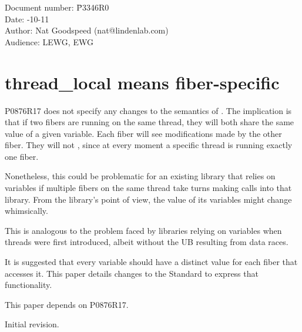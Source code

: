\documentclass[fontsize=10pt,paper=A4,pagesize,DIV=15]{scrartcl}
\begin{document}
\small
\begin{tabbing}
    Document number: \= P3346R0\\
    Date:            -10-11\\
    Author:          \> Nat Goodspeed (nat@lindenlab.com)\\
    Audience:        \> LEWG, EWG\\
\end{tabbing}

\section*{thread\_local means fiber-specific}


\tableofcontents


\label{abstract}

P0876R17\cite{P0876R17} does not specify any changes to the semantics of
. The implication is that
if two fibers are running on the same thread, they will both share the same
value of a given \tlocal variable. Each fiber will see modifications made by
the other fiber. They will not , since at every
moment a specific thread is running exactly one fiber.

Nonetheless, this could be problematic for an existing library that relies on
\tlocal variables if multiple fibers on the same thread take turns making
calls into that library. From the library's point of view, the value of its
\tlocal variables might change whimsically.

This is analogous to the problem faced by libraries relying on 
variables when threads were first introduced, albeit without the UB resulting
from data races.

It is suggested that every \tlocal variable should have a distinct value for
each fiber that accesses it. This paper details changes to the
Standard\cite{Standard} to express that functionality. 

This paper depends on P0876R17.

\label{history}
Initial revision.

\end{document}
